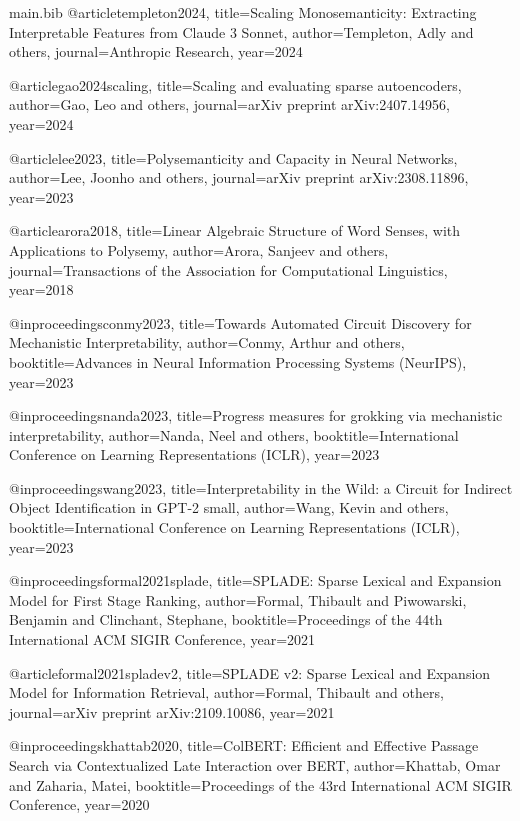 \begin{filecontents*}{main.bib}
@article{templeton2024,
  title={Scaling Monosemanticity: Extracting Interpretable Features from Claude 3 Sonnet},
  author={Templeton, Adly and others},
  journal={Anthropic Research},
  year={2024}
}

@article{gao2024scaling,
  title={Scaling and evaluating sparse autoencoders},
  author={Gao, Leo and others},
  journal={arXiv preprint arXiv:2407.14956},
  year={2024}
}

@article{lee2023,
  title={Polysemanticity and Capacity in Neural Networks},
  author={Lee, Joonho and others},
  journal={arXiv preprint arXiv:2308.11896},
  year={2023}
}

@article{arora2018,
  title={Linear Algebraic Structure of Word Senses, with Applications to Polysemy},
  author={Arora, Sanjeev and others},
  journal={Transactions of the Association for Computational Linguistics},
  year={2018}
}

@inproceedings{conmy2023,
  title={Towards Automated Circuit Discovery for Mechanistic Interpretability},
  author={Conmy, Arthur and others},
  booktitle={Advances in Neural Information Processing Systems (NeurIPS)},
  year={2023}
}

@inproceedings{nanda2023,
  title={Progress measures for grokking via mechanistic interpretability},
  author={Nanda, Neel and others},
  booktitle={International Conference on Learning Representations (ICLR)},
  year={2023}
}

@inproceedings{wang2023,
  title={Interpretability in the Wild: a Circuit for Indirect Object Identification in GPT-2 small},
  author={Wang, Kevin and others},
  booktitle={International Conference on Learning Representations (ICLR)},
  year={2023}
}

@inproceedings{formal2021splade,
  title={SPLADE: Sparse Lexical and Expansion Model for First Stage Ranking},
  author={Formal, Thibault and Piwowarski, Benjamin and Clinchant, Stephane},
  booktitle={Proceedings of the 44th International ACM SIGIR Conference},
  year={2021}
}

@article{formal2021spladev2,
  title={SPLADE v2: Sparse Lexical and Expansion Model for Information Retrieval},
  author={Formal, Thibault and others},
  journal={arXiv preprint arXiv:2109.10086},
  year={2021}
}

@inproceedings{khattab2020,
  title={ColBERT: Efficient and Effective Passage Search via Contextualized Late Interaction over BERT},
  author={Khattab, Omar and Zaharia, Matei},
  booktitle={Proceedings of the 43rd International ACM SIGIR Conference},
  year={2020}
}


\end{filecontents*}
